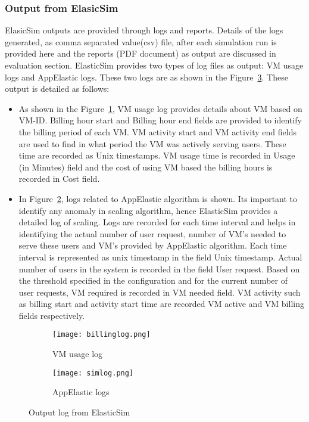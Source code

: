 \subsubsection{Output from ElasicSim}
\label{subs:Output from ElasicSim}
ElasicSim outputs are provided through logs and reports. Details of the logs generated, as comma separated value(csv) file, after each simulation run is provided here and the reports (PDF document) as output are discussed in evaluation section. ElasticSim provides two types of log files as output: VM usage logs and AppElastic logs. These two logs are as shown in the Figure~\ref{fig:elasticsimlogs}. These output is detailed as follows:
\begin{itemize}
  \item As shown in the Figure~\ref{figure:costlog}, VM usage log provides details about VM based on VM-ID. Billing hour start and Billing hour end fields are provided to identify the billing period of each VM. VM activity start and VM activity end fields are used to find in what period the VM was actively serving users. These time are recorded as Unix timestamps. VM usage time is recorded in Usage (in Minutes) field and the cost of using VM based the billing hours is recorded in Cost field.
  \item In Figure~\ref{figure:appelasticlogs}, logs related to AppElastic algorithm is shown. Its important to identify any anomaly in scaling algorithm, hence ElasticSim provides a detailed log of scaling. Logs are recorded for each time interval and helps in identifying the actual number of user request, number of VM's needed to serve these users and VM's provided by AppElastic algorithm. Each time interval is represented as unix timestamp in the field Unix timestamp. Actual number of users in the system is recorded in the field User request. Based on the threshold specified in the configuration and for the current number of user requests, VM required is recorded in VM needed field. VM activity such as billing start and activity start time are recorded VM active and VM billing fields respectively.
\end{itemize}
\begin{figure}
     \centering
     \begin{subfigure}[b]{1.0\textwidth}
         \texttt{[image: billinglog.png]}
         \caption{VM usage log}
         \label{figure:costlog}
     \end{subfigure}
     \begin{subfigure}[b]{0.9\textwidth}
         \texttt{[image: simlog.png]}
         \caption{AppElastic logs}
         \label{figure:appelasticlogs}
     \end{subfigure}
     \caption{Output log from ElasticSim}
     \label{fig:elasticsimlogs}
 \end{figure}
